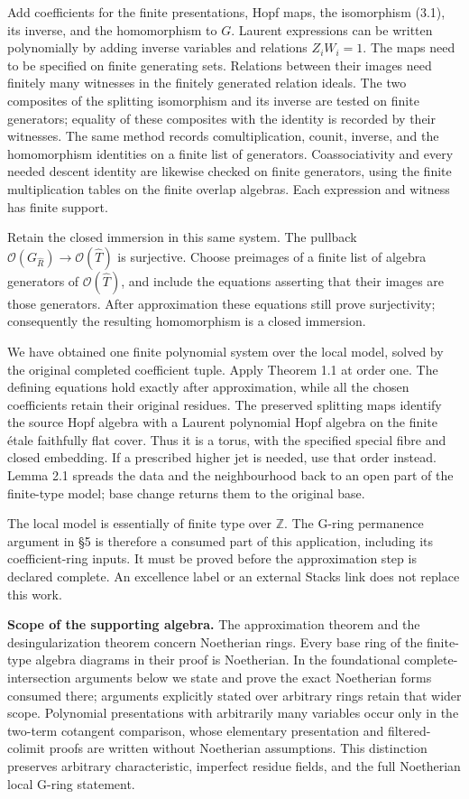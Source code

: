 \documentclass[11pt,a4paper,openany]{report}
\begin{document}
Add coefficients for the finite presentations, Hopf maps, the isomorphism (3.1), its inverse, and the homomorphism to \(G\). Laurent expressions can be written polynomially by adding inverse variables and relations \(Z_iW_i=1\). The maps need to be specified on finite generating sets. Relations between their images need finitely many witnesses in the finitely generated relation ideals. The two composites of the splitting isomorphism and its inverse are tested on finite generators; equality of these composites with the identity is recorded by their witnesses. The same method records comultiplication, counit, inverse, and the homomorphism identities on a finite list of generators. Coassociativity and every needed descent identity are likewise checked on finite generators, using the finite multiplication tables on the finite overlap algebras. Each expression and witness has finite support.

Retain the closed immersion in this same system. The pullback \(\mathcal O(G_{\widehat R})\to\mathcal O(\widehat T)\) is surjective. Choose preimages of a finite list of algebra generators of \(\mathcal O(\widehat T)\), and include the equations asserting that their images are those generators. After approximation these equations still prove surjectivity; consequently the resulting homomorphism is a closed immersion.

We have obtained one finite polynomial system over the local model, solved by the original completed coefficient tuple. Apply Theorem 1.1 at order one. The defining equations hold exactly after approximation, while all the chosen coefficients retain their original residues. The preserved splitting maps identify the source Hopf algebra with a Laurent polynomial Hopf algebra on the finite étale faithfully flat cover. Thus it is a torus, with the specified special fibre and closed embedding. If a prescribed higher jet is needed, use that order instead. Lemma 2.1 spreads the data and the neighbourhood back to an open part of the finite-type model; base change returns them to the original base.

The local model is essentially of finite type over \(\mathbb Z\). The G-ring permanence argument in §5 is therefore a consumed part of this application, including its coefficient-ring inputs. It must be proved before the approximation step is declared complete. An excellence label or an external Stacks link does not replace this work.

\textbf{Scope of the supporting algebra.} The approximation theorem and the desingularization theorem concern Noetherian rings. Every base ring of the finite-type algebra diagrams in their proof is Noetherian. In the foundational complete-intersection arguments below we state and prove the exact Noetherian forms consumed there; arguments explicitly stated over arbitrary rings retain that wider scope. Polynomial presentations with arbitrarily many variables occur only in the two-term cotangent comparison, whose elementary presentation and filtered-colimit proofs are written without Noetherian assumptions. This distinction preserves arbitrary characteristic, imperfect residue fields, and the full Noetherian local G-ring statement.
\end{document}
